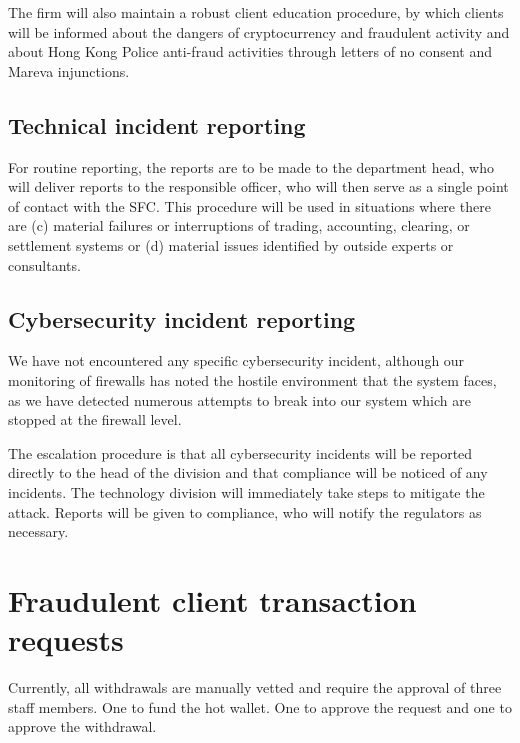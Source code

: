 The firm will also maintain a robust client education procedure, by
which clients will be informed about the dangers of cryptocurrency and
fraudulent activity and about Hong Kong Police anti-fraud activities
through letters of no consent and Mareva injunctions.

\subsection{Technical incident reporting}

For routine reporting, the reports are to be made to the department
head, who will deliver reports to the responsible officer, who will
then serve as a single point of contact with the SFC.  This procedure
will be used in situations where there are (c) material failures or
interruptions of trading, accounting, clearing, or settlement systems
or (d) material issues identified by outside experts or consultants.

\subsection{Cybersecurity incident reporting}

We have not encountered any specific cybersecurity incident, although
our monitoring of firewalls has noted the hostile environment that
the system faces, as we have detected numerous attempts to break into our
system which are stopped at the firewall level.

The escalation procedure is that all cybersecurity incidents will be
reported directly to the head of the division and that compliance will
be noticed of any incidents.  The technology division will immediately
take steps to mitigate the attack.  Reports will be given to
compliance, who will notify the regulators as necessary.


\section{Fraudulent client transaction requests}
Currently, all withdrawals are manually vetted and require the approval
of three staff members.  One to fund the hot wallet.  One to approve
the request and one to approve the withdrawal.

